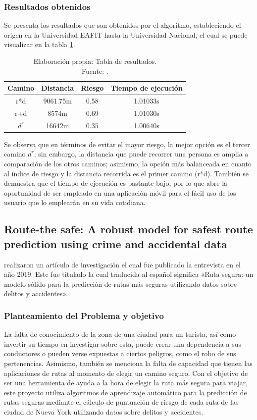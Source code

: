 \subsubsection{Resultados obtenidos}
Se presenta los resultados que son obtenidos por el algoritmo, estableciendo el origen en la Universidad EAFIT hasta la Universidad Nacional, el cual se puede visualizar en la tabla \ref{tab:results}.%

\begin{table}[h]
	\centering
	\begin{tabular}{c|c|c|c}
		Camino & Distancia & Riesgo & Tiempo de ejecución\\\hline
		r*d & 9061.75m & 0.58& 1.01033s\\
		r+d & 8574m& 0.69& 1.01030s\\
		$d^r$& 16642m& 0.35& 1.00640s
	\end{tabular}
	\caption{\label{tab:results}Elaboración propia: Tabla de resultados.\\
		Fuente: \citep*{pr_areiza}. }
\end{table}


Se observa que en términos de evitar el mayor riesgo, la mejor opción es el tercer camino $d^r$; sin embargo, la distancia que puede recorrer una persona es amplia a comparación de los otros caminos; asimismo, la opción más balanceada en cuanto al índice de riesgo y la distancia recorrida es el primer camino (r*d). También se demuestra que el tiempo de ejecución es bastante bajo, por lo que abre la oportunidad de ser empleado en una aplicación móvil para el fácil uso de los usuario que lo emplearán en su vida cotidiana.


\subsection{Route-the safe: A robust model for safest route prediction using crime and accidental data \citep*{pr_Soni}}
\citeauthor{pr_Soni} realizaron un artículo de investigación el cual fue publicado la entrevista en el año 2019. Este fue titulado  la cual traducida al español significa «Ruta segura: un modelo sólido para la predicción de rutas más seguras utilizando datos sobre delitos y accidentes».

\subsubsection{Planteamiento del Problema y objetivo }
La falta de conocimiento de la zona de una ciudad para un turista, así como invertir su tiempo en investigar sobre esta, puede crear una dependencia a sus conductores o pueden verse expuestas a ciertos peligros, como el robo de sus pertenencias. Asimismo, también se menciona la falta de capacidad que tienen las aplicaciones de rutas al momento de elegir un camino seguro. Con el objetivo de ser una herramienta de ayuda a la hora de elegir la ruta más segura para viajar, este proyecto  utiliza algoritmos de aprendizaje automático para la predicción de rutas seguras mediante el cálculo de puntuación de riesgo de cada ruta de las ciudad de Nueva York utilizando datos sobre delitos y accidentes.

